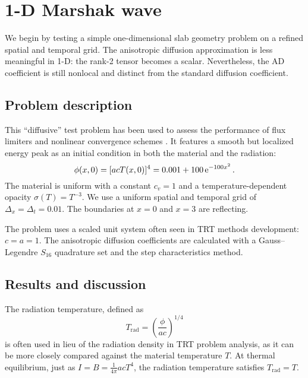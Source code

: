 \section{1-D Marshak wave}\label{sec:trtOned}
We begin by testing a simple one-dimensional slab geometry problem on a refined
spatial and temporal grid. The anisotropic diffusion approximation is less
meaningful in 1-D: the rank-2 tensor becomes a scalar. Nevertheless, the AD
coefficient is still nonlocal and distinct from the standard diffusion
coefficient.

\subsection{Problem description}
This ``diffusive'' test problem has been used to assess the
performance of flux limiters and nonlinear convergence schemes
\cite{Rau2005,Ols2007}. It features a smooth but
localized energy peak as an initial condition in both the material and the
radiation:
\begin{equation*}
  \phi(x,0) = [ a c T(x,0)]^{4} = 0.001 + 100 \mathop{}\!\mathrm{e}^{-100 x^2} \,.
\end{equation*}
The material is uniform with a constant $c_v = 1$ and a temperature-dependent
opacity $\sigma(T) = T^{-3}$. We use a uniform spatial and temporal grid of
$\Delta_x = \Delta_t = 0.01$. The boundaries at $x=0$ and $x=3$ are reflecting.

The problem uses a scaled unit system often seen in TRT methods development: $c
= a = 1$. The anisotropic diffusion coefficients are calculated with a
Gauss--Legendre $S_{16}$ quadrature set and the step characteristics method.

\subsection{Results and discussion}

The radiation temperature, defined as
\begin{equation}\label{eq:radTemp}
  T_\text{rad} = \left( \frac{\phi}{ac} \right)^{1/4}
\end{equation}
is often used in lieu of the radiation density in TRT problem analysis, as it
can be more closely compared against the material temperature $T$. At
thermal equilibrium, just as $I = B = \frac{1}{4\pi} acT^4$, the radiation
temperature satisfies $T_\text{rad} = T$.

